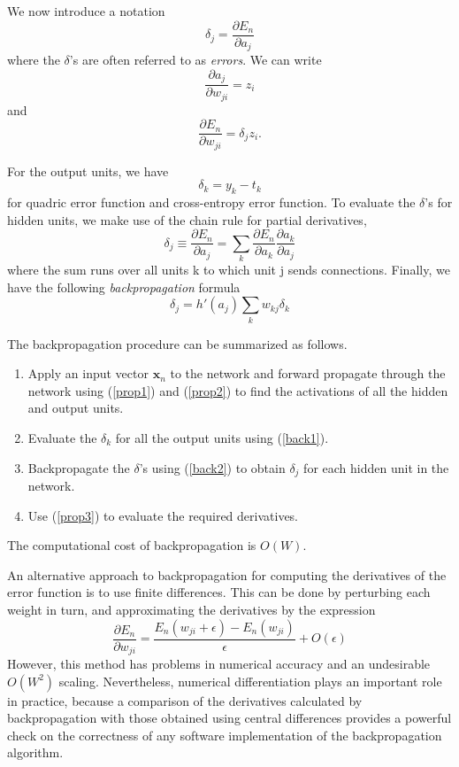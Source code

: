 \documentclass[a4paper]{book}
\renewcommand{\bf}{\mathbf}
\newcommand{\imp}[1]{\textit{#1}}
\begin{document}
We now introduce a notation
\begin{equation}
	\delta_j = \frac{\partial E_n}{\partial a_j}
\end{equation}
where the $\delta$'s are often referred to as \imp{errors}. We can write
\begin{equation}
	\frac{\partial a_j}{\partial w_{ji}} = z_i 
\end{equation}
and
\begin{equation}
	\frac{\partial E_n}{\partial w_{ji}} = \delta_j z_i. \label{prop3}
\end{equation}

For the output units, we have
\begin{equation}
	\delta_k = y_k - t_k \label{back1}
\end{equation}
for quadric error function and cross-entropy error function. To evaluate the $\delta$'s for hidden units, we make use of the chain rule for partial derivatives,
\begin{equation}
	\delta_j \equiv \frac{\partial E_n}{\partial a_j} = \sum_k \frac{\partial E_n}{\partial a_k}\frac{\partial a_k}{\partial a_j}
\end{equation}
where the sum runs over all units k to which unit j sends connections. Finally, we have the following \emph{backpropagation} formula
\begin{equation}
	\delta_j = h'(a_j)\sum_k w_{kj} \delta_k \label{back2}
\end{equation}

The backpropagation procedure can be summarized as follows.
\begin{enumerate}
	\item Apply an input vector $\bf{x}_n$ to the network and forward propagate through the network using (\ref{prop1}) and (\ref{prop2}) to find the activations of all the hidden and output units.
	\item Evaluate the $\delta_k$ for all the output units using (\ref{back1}).
	\item Backpropagate the $\delta$'s using (\ref{back2}) to obtain $\delta_j$ for each hidden unit in the network.
	\item Use (\ref{prop3}) to evaluate the required derivatives.
\end{enumerate}
The computational cost of backpropagation is $O(W)$.

An alternative approach to backpropagation for computing the derivatives of the error function is to use finite differences. This can be done by perturbing each weight in turn, and approximating the derivatives by the expression
\begin{equation}
	\frac{\partial E_n}{\partial w_{ji}} = \frac{E_n(w_{ji}+\epsilon)-E_n(w_{ji})}{\epsilon} + O(\epsilon)
\end{equation}
However, this method has problems in numerical accuracy and an undesirable $O(W^2)$ scaling. Nevertheless, numerical differentiation plays an important role in practice, because a comparison of the derivatives calculated by backpropagation with those obtained using central differences provides a powerful check on the correctness of any software implementation of the backpropagation algorithm.
\end{document}
